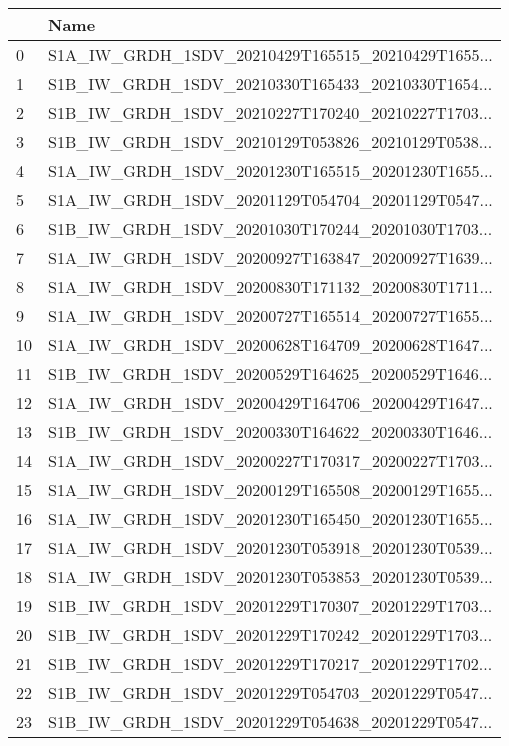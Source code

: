 \begin{tabular}{ll}
\toprule
{} &                                               Name \\
\midrule
0   &  S1A\_IW\_GRDH\_1SDV\_20210429T165515\_20210429T1655... \\
1   &  S1B\_IW\_GRDH\_1SDV\_20210330T165433\_20210330T1654... \\
2   &  S1B\_IW\_GRDH\_1SDV\_20210227T170240\_20210227T1703... \\
3   &  S1B\_IW\_GRDH\_1SDV\_20210129T053826\_20210129T0538... \\
4   &  S1A\_IW\_GRDH\_1SDV\_20201230T165515\_20201230T1655... \\
5   &  S1A\_IW\_GRDH\_1SDV\_20201129T054704\_20201129T0547... \\
6   &  S1B\_IW\_GRDH\_1SDV\_20201030T170244\_20201030T1703... \\
7   &  S1A\_IW\_GRDH\_1SDV\_20200927T163847\_20200927T1639... \\
8   &  S1A\_IW\_GRDH\_1SDV\_20200830T171132\_20200830T1711... \\
9   &  S1A\_IW\_GRDH\_1SDV\_20200727T165514\_20200727T1655... \\
10  &  S1A\_IW\_GRDH\_1SDV\_20200628T164709\_20200628T1647... \\
11  &  S1B\_IW\_GRDH\_1SDV\_20200529T164625\_20200529T1646... \\
12  &  S1A\_IW\_GRDH\_1SDV\_20200429T164706\_20200429T1647... \\
13  &  S1B\_IW\_GRDH\_1SDV\_20200330T164622\_20200330T1646... \\
14  &  S1A\_IW\_GRDH\_1SDV\_20200227T170317\_20200227T1703... \\
15  &  S1A\_IW\_GRDH\_1SDV\_20200129T165508\_20200129T1655... \\
16  &  S1A\_IW\_GRDH\_1SDV\_20201230T165450\_20201230T1655... \\
17  &  S1A\_IW\_GRDH\_1SDV\_20201230T053918\_20201230T0539... \\
18  &  S1A\_IW\_GRDH\_1SDV\_20201230T053853\_20201230T0539... \\
19  &  S1B\_IW\_GRDH\_1SDV\_20201229T170307\_20201229T1703... \\
20  &  S1B\_IW\_GRDH\_1SDV\_20201229T170242\_20201229T1703... \\
21  &  S1B\_IW\_GRDH\_1SDV\_20201229T170217\_20201229T1702... \\
22  &  S1B\_IW\_GRDH\_1SDV\_20201229T054703\_20201229T0547... \\
23  &  S1B\_IW\_GRDH\_1SDV\_20201229T054638\_20201229T0547... \\

\end{tabular}

